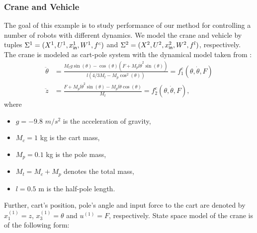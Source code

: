 \subsubsection{Crane and Vehicle}
\label{subsec}
The goal of this example is to study performance of our method for controlling a number of robots with different dynamics. %
We model the crane and vehicle by tuples $\Sigma^1=(X^1,U^1,x_{\mathsf{in}}^1,W^1,f^c)$ and $\Sigma^2=(X^2,U^2,x_{\mathsf{in}}^2,W^2,f^l)$, respectively. The crane is modeled as cart-pole system with the dynamical model taken from \cite{Barto1983}:
\begin{align*}
	\ddot{\theta} &= \frac{M_tg\sin(\theta) - \cos(\theta)(F + M_pl \dot{\theta}^2 \sin(\theta))}{l(4/3 M_t- M_p \cos^2(\theta))}=f^c_1(\theta,\dot{\theta},F)\\
	\ddot{z}&= \frac{F + M_pl \dot{\theta}^2 \sin(\theta)-M_pl \ddot{\theta} \cos(\theta)}{M_t}=f^c_2(\theta,\dot{\theta},F),
\end{align*}
where
\begin{itemize}
	\item[] $g=-9.8$ $m/s^2$ is the acceleration of gravity,
	\item[] $M_c=1$ kg is the cart mass,
	\item[] $M_p=0.1$ kg is the pole mass,
	\item[] $M_t=M_c+M_p$ denotes the total mass,
	\item[] $l=0.5$ m is the half-pole length.
\end{itemize}
Further, cart's position, pole's angle and input force to the cart are denoted by $x_1^{(1)}=z$, $x_3^{(1)}=\theta$ and $u^{(1)}=F$, respectively. State space model of the crane is of the following form:
